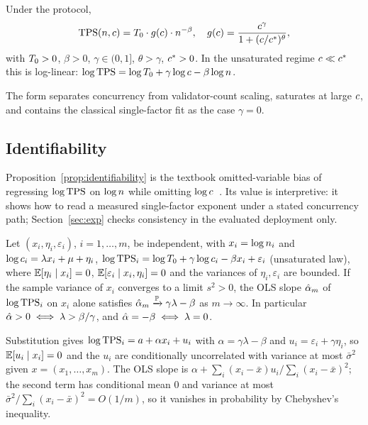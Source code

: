 \begin{Def}
\label{def:bifactor}
Under the \RNM{} protocol,
\begin{equation}
\TPS(\n,\cc)=\Tzero\cdot\gfun(\cc)\cdot\n^{-\beta},
\quad
\gfun(\cc)=\frac{\cc^{\gamma}}{1+(\cc/\csat)^{\theta}},
\label{eq:bifactor}
\end{equation}
with $T_{0}>0$, $\beta>0$, $\gamma\in(0,1]$, $\theta>\gamma$, $c^{\ast}>0$.
In the unsaturated regime $c\ll c^{\ast}$ this is log-linear:
$\log\mathrm{TPS}=\log T_{0}+\gamma\log c-\beta\log n$.
\end{Def}

The form separates concurrency from validator-count scaling, saturates at large
$c$, and contains the classical single-factor fit as the case $\gamma=0$.

\subsection{Identifiability}

Proposition~\ref{prop:identifiability} is the textbook \mbox{omitted-variable}
bias of regressing $\log\mathrm{TPS}$ on $\log n$ while omitting
$\log c$~\cite{wooldridge2010}. Its value is interpretive: it shows how to read
a measured single-factor exponent under a stated concurrency path;
Section~\ref{sec:exp} checks consistency in the evaluated deployment only.

\begin{Proposition}
\label{prop:identifiability}
Let $(x_{i},\eta_{i},\varepsilon_{i})$, $i=1,\dots,m$, be independent, with
$x_{i}=\log n_{i}$ and
$\log c_{i}=\lambda x_{i}+\mu+\eta_{i}$,
$\log\mathrm{TPS}_{i}=\log T_{0}+\gamma\log c_{i}-\beta x_{i}+\varepsilon_{i}$
(unsaturated law), where $\mathbb{E}[\eta_{i}\mid x_{i}]=0$,
$\mathbb{E}[\varepsilon_{i}\mid x_{i},\eta_{i}]=0$ and the variances of
$\eta_{i},\varepsilon_{i}$ are bounded. If the sample variance of $x_{i}$
converges to a limit $s^{2}>0$, the OLS slope $\hat{\alpha}_{m}$ of
$\log\mathrm{TPS}_{i}$ on $x_{i}$ alone satisfies
$\hat{\alpha}_{m}\xrightarrow{\mathbb{P}}\gamma\lambda-\beta$ as $m\to\infty$.
In particular $\hat{\alpha}>0\iff\lambda>\beta/\gamma$, and $\hat{\alpha}=-\beta\iff\lambda=0$.
\end{Proposition}

\begin{Proof}
Substitution gives $\log\mathrm{TPS}_{i}=a+\alpha x_{i}+u_{i}$ with
$\alpha=\gamma\lambda-\beta$ and $u_{i}=\varepsilon_{i}+\gamma\eta_{i}$, so
$\mathbb{E}[u_{i}\mid x_{i}]=0$ and the $u_{i}$ are conditionally uncorrelated with
variance at most $\bar\sigma^{2}$ given $x=(x_{1},\dots,x_{m})$. The OLS slope
is $\alpha+\sum_{i}(x_{i}-\bar x)u_{i}/\sum_{i}(x_{i}-\bar x)^{2}$; the second
term has conditional mean $0$ and variance at most
$\bar\sigma^{2}/\sum_{i}(x_{i}-\bar x)^{2}=O(1/m)$, so it vanishes in
probability by Chebyshev's inequality.
\end{Proof}

